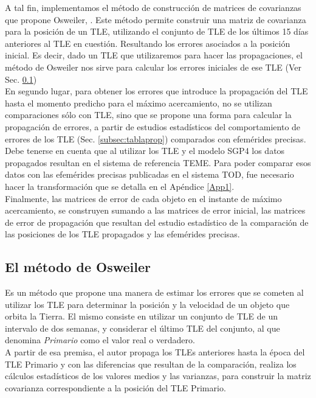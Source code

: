 {\color{red}{Elegimos OSW}}A tal fin, implementamos el m\'etodo de construcci\'on de matrices de covarianzas que propone Osweiler, \citep{osweiler}. Este m\'etodo permite construir una matriz de covarianza para la posici\'on de un TLE, utilizando el conjunto de TLE de los \'ultimos 15 d\'ias anteriores al TLE en cuesti\'on. Resultando los errores asociados a la posici\'on inicial. Es decir, dado un TLE que utilizaremos para hacer las propagaciones, el m\'etodo de Osweiler nos sirve para calcular los errores iniciales de ese TLE (Ver Sec. \ref{subsec:osw})\\

En segundo lugar, para obtener los errores que introduce la propagaci\'on del TLE hasta el momento predicho para el m\'aximo acercamiento, no se utilizan comparaciones s\'olo con TLE, sino que se propone una forma para calcular la propagaci\'on de errores, a partir de estudios estad\'isticos del comportamiento de errores de los TLE (Sec. \ref{subsec:tablaprop}) comparados con efem\'erides precisas.\\

Debe tenerse en cuenta que al utilizar los TLE y el modelo SGP4  los datos propagados resultan en el sistema de referencia \ac{TEME}. Para poder comparar esos datos con las efem\'erides precisas publicadas en el sistema TOD, fue necesario hacer la transformaci\'on que se detalla en el Ap\'endice \ref{App1}.\\

Finalmente, las matrices de error de cada objeto en el instante de m\'aximo acercamiento, se construyen sumando a las matrices de error inicial, las matrices de error de propagaci\'on que resultan del estudio estad\'istico de la comparaci\'on de las posiciones de los TLE propagados y las efem\'erides precisas.

\subsection{ El m\'etodo de Osweiler}\label{subsec:osw}
Es un m\'etodo que propone una manera de estimar los errores que se cometen al utilizar los TLE para determinar la posici\'on y la velocidad de un objeto que orbita la Tierra.
El mismo consiste en utilizar un conjunto de TLE de un intervalo de dos semanas, y considerar el \'ultimo TLE del conjunto, al que denomina {\it{Primario}} como el valor real o verdadero.\\
A partir de esa premisa, el autor propaga los TLEs anteriores hasta la \'epoca del TLE Primario y con las diferencias que resultan de la comparaci\'on, realiza los c\'alculos estad\'isticos de los valores medios y las varianzas, para construir la matriz covarianza correspondiente a la posici\'on del TLE Primario.\\

